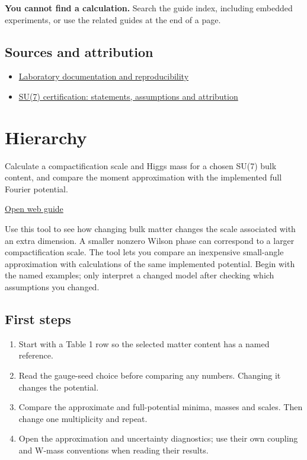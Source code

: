 \documentclass[11pt,a4paper]{article}
\begin{document}
\textbf{You cannot find a calculation.} Search the guide index, including embedded experiments, or use the related guides at the end of a page.

\subsection*{Sources and attribution}
\begin{itemize}
\item \href{https://karlesmarin.github.io/ghu-explorer/docs/index.html}{Laboratory documentation and reproducibility}
\item \href{https://karlesmarin.github.io/ghu-explorer/docs/su7-certification.html}{SU(7) certification: statements, assumptions and attribution}
\end{itemize}
\section{Hierarchy}
Calculate a compactification scale and Higgs mass for a chosen SU(7) bulk content, and compare the moment approximation with the implemented full Fourier potential.

\href{https://karlesmarin.github.io/ghu-explorer/guide/hierarchy/index.html}{Open web guide}

Use this tool to see how changing bulk matter changes the scale associated with an extra dimension. A smaller nonzero Wilson phase can correspond to a larger compactification scale. The tool lets you compare an inexpensive small-angle approximation with calculations of the same implemented potential. Begin with the named examples; only interpret a changed model after checking which assumptions you changed.
\subsection*{First steps}
\begin{enumerate}
\item Start with a Table 1 row so the selected matter content has a named reference.
\item Read the gauge-seed choice before comparing any numbers. Changing it changes the potential.
\item Compare the approximate and full-potential minima, masses and scales. Then change one multiplicity and repeat.
\item Open the approximation and uncertainty diagnostics; use their own coupling and W-mass conventions when reading their results.
\end{enumerate}
\end{document}
